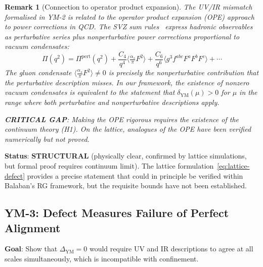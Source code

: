 \documentclass[11pt]{article}
\newtheorem{remark}[theorem]{Remark}
\begin{document}
\begin{remark}[Connection to operator product expansion]
\label{rem:ym2-ope}
The UV/IR mismatch formalised in YM-2 is related to the operator product
expansion (OPE) approach to power corrections in QCD.  The SVZ sum
rules~\cite{SVZ} express hadronic observables as perturbative series plus
nonperturbative power corrections proportional to vacuum condensates:
\begin{equation}\label{eq:ope-condensate}
  \Pi(q^2) = \Pi^{\mathrm{pert}}(q^2)
  + \frac{C_4}{q^4}\langle\tfrac{\alpha_s}{\pi}F^2\rangle
  + \frac{C_6}{q^6}\langle g^3 f^{abc} F^a F^b F^c\rangle + \cdots
\end{equation}
The gluon condensate $\langle\frac{\alpha_s}{\pi}F^2\rangle \neq 0$ is
precisely the nonperturbative contribution that the perturbative
description misses.  In our framework, the existence of nonzero vacuum
condensates is equivalent to the statement that
$\delta_{\mathrm{YM}}(\mu) > 0$ for $\mu$ in the range where both
perturbative and nonperturbative descriptions apply.

\textbf{CRITICAL GAP}: Making the OPE rigorous requires the existence
of the continuum theory (H1).  On the lattice, analogues of the OPE have
been verified numerically but not proved.
\end{remark}

\textbf{Status}: \textbf{STRUCTURAL} (physically clear, confirmed by
lattice simulations, but formal proof requires continuum limit).
The lattice formulation~\eqref{eq:lattice-defect} provides a precise
statement that could in principle be verified within Balaban's RG
framework, but the requisite bounds have not been established.

\subsection{YM-3: Defect Measures Failure of Perfect Alignment}
\label{sec:ym3}

\textbf{Goal}: Show that $\Delta_{\mathrm{YM}} = 0$ would require UV
and IR descriptions to agree at all scales simultaneously, which is
incompatible with confinement.
\end{document}
